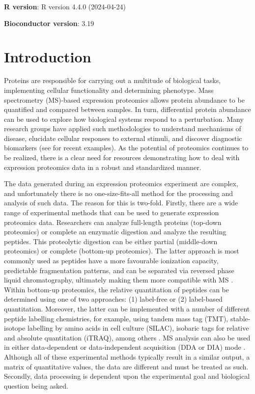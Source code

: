 \documentclass[9pt,a4paper,]{extarticle}
\begin{document}
\clearpage
\pagestyle{main}

\textbf{R version}: R version 4.4.0 (2024-04-24)

\textbf{Bioconductor version}: 3.19

\section{Introduction}\label{introduction}

Proteins are responsible for carrying out a multitude of biological tasks,
implementing cellular functionality and determining phenotype. Mass spectrometry
(MS)-based expression proteomics allows protein abundance to be quantified and
compared between samples. In turn, differential protein abundance can be used to
explore how biological systems respond to a perturbation. Many research groups
have applied such methodologies to understand mechanisms of disease, elucidate
cellular responses to external stimuli, and discover diagnostic biomarkers (see
\citep{PinaJimnez2021, AmiriDashatan2021, Anitua2018} for recent examples). As the
potential of proteomics continues to be realized, there is a clear need for
resources demonstrating how to deal with expression proteomics data in a robust
and standardized manner.

The data generated during an expression proteomics experiment are complex, and
unfortunately there is no one-size-fits-all method for the processing and analysis
of such data. The reason for this is two-fold. Firstly, there are a wide range
of experimental methods that can be used to generate expression proteomics data.
Researchers can analyze full-length proteins (top-down proteomics) or complete
an enzymatic digestion and analyze the resulting peptides. This proteolytic
digestion can be either partial (middle-down proteomics) or complete (bottom-up
proteomics). The latter approach is most commonly used as peptides have a more
favourable ionization capacity, predictable fragmentation patterns, and can be
separated via reversed phase liquid chromatography, ultimately making them more
compatible with MS \citep{Dupree2020}. Within bottom-up proteomics, the relative
quantitation of peptides can be determined using one of two approaches: (1)
label-free or (2) label-based quantitation. Moreover, the latter can be
implemented with a number of different peptide labelling chemistries, for example,
using tandem mass tag (TMT), stable-isotope labelling by amino acids in cell
culture (SILAC), isobaric tags for relative and absolute quantitation (iTRAQ),
among others \citep{Obermaier2015}. MS analysis can also be used in either data-dependent
or data-independent acquisition (DDA or DIA) mode \citep{FernndezCosta2020, Hu2016}.
Although all of these experimental methods typically result in a similar output,
a matrix of quantitative values, the data are different and must be treated as such.
Secondly, data processing is dependent upon the experimental goal and biological
question being asked.
\end{document}
